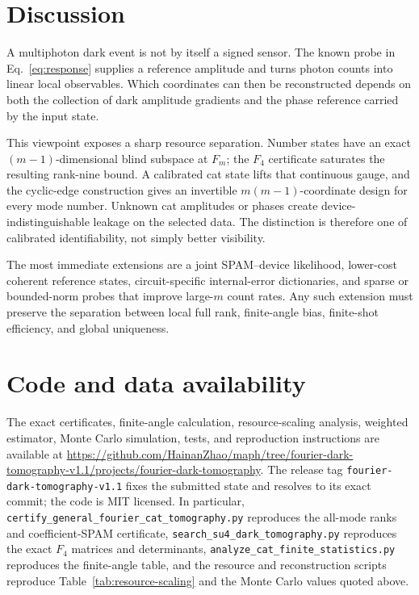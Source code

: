 \documentclass[aps,pra,reprint,amsmath,amssymb,superscriptaddress,longbibliography]{revtex4-2}
\begin{document}
\section{Discussion}
\label{sec:discussion}

A multiphoton dark event is not by itself a signed sensor.  The known probe
in Eq.~\eqref{eq:response} supplies a reference amplitude and turns photon
counts into linear local observables.  Which coordinates can then be
reconstructed depends on both the collection of dark amplitude gradients
and the phase reference carried by the input state.

This viewpoint exposes a sharp resource separation.  Number states have an
exact $(m-1)$-dimensional blind subspace at $F_m$; the $F_4$ certificate
saturates the resulting rank-nine bound.  A calibrated cat state lifts that
continuous gauge, and the cyclic-edge construction gives an invertible
$m(m-1)$-coordinate design for every mode number.  Unknown cat amplitudes
or phases create device-indistinguishable leakage on the selected data.  The
distinction is therefore one of calibrated identifiability, not simply
better visibility.

The most immediate extensions are a joint SPAM--device likelihood,
lower-cost coherent reference states, circuit-specific internal-error
dictionaries, and sparse or bounded-norm probes that improve large-$m$
count rates.  Any such extension must preserve the separation between local
full rank, finite-angle bias, finite-shot efficiency, and global uniqueness.

\section{Code and data availability}
\label{sec:code}

The exact certificates, finite-angle calculation, resource-scaling analysis,
weighted estimator, Monte Carlo simulation, tests, and reproduction
instructions are available at
\url{https://github.com/HainanZhao/maph/tree/fourier-dark-tomography-v1.1/projects/fourier-dark-tomography}.
The release tag \texttt{fourier-dark-tomography-v1.1} fixes the submitted
state and resolves to its exact commit; the code is MIT licensed.  In
particular,
\texttt{certify\_general\_fourier\_cat\_tomography.py} reproduces the
all-mode ranks and coefficient-SPAM certificate,
\texttt{search\_su4\_dark\_tomography.py} reproduces the exact $F_4$
matrices and determinants,
\texttt{analyze\_cat\_finite\_statistics.py} reproduces the finite-angle
table, and the resource and reconstruction scripts reproduce
Table~\ref{tab:resource-scaling} and the Monte Carlo values quoted above.
\end{document}
